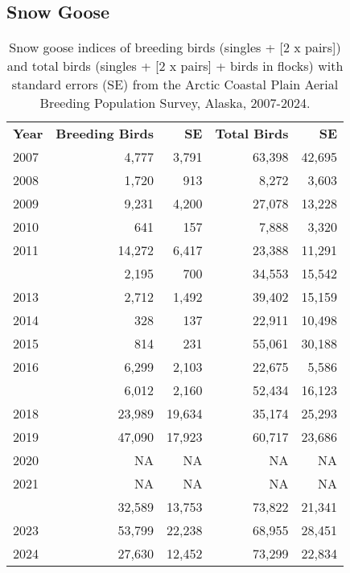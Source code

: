 \documentclass[
]{article}
\begin{document}
\newpage{}

\subsection*{Snow Goose}\label{snow-goose-1}

\begingroup\fontsize{10}{12}\selectfont

\begin{longtable}[t]{lrrrr}

\caption{\label{tbl-SNGO}Snow goose indices of breeding birds (singles +
{[}2 x pairs{]}) and total birds (singles + {[}2 x pairs{]} + birds in
flocks) with standard errors (SE) from the Arctic Coastal Plain Aerial
Breeding Population Survey, Alaska, 2007-2024.}

\tabularnewline

\\
\toprule
\textbf{Year} & \textbf{Breeding Birds} & \textbf{SE} & \textbf{Total Birds} & \textbf{SE}\\
\midrule
2007 & 4,777 & 3,791 & 63,398 & 42,695\\
2008 & 1,720 & 913 & 8,272 & 3,603\\
2009 & 9,231 & 4,200 & 27,078 & 13,228\\
2010 & 641 & 157 & 7,888 & 3,320\\
2011 & 14,272 & 6,417 & 23,388 & 11,291\\
\addlinespace
2012 & 2,195 & 700 & 34,553 & 15,542\\
2013 & 2,712 & 1,492 & 39,402 & 15,159\\
2014 & 328 & 137 & 22,911 & 10,498\\
2015 & 814 & 231 & 55,061 & 30,188\\
2016 & 6,299 & 2,103 & 22,675 & 5,586\\
\addlinespace
2017 & 6,012 & 2,160 & 52,434 & 16,123\\
2018 & 23,989 & 19,634 & 35,174 & 25,293\\
2019 & 47,090 & 17,923 & 60,717 & 23,686\\
2020 & NA & NA & NA & NA\\
2021 & NA & NA & NA & NA\\
\addlinespace
2022 & 32,589 & 13,753 & 73,822 & 21,341\\
2023 & 53,799 & 22,238 & 68,955 & 28,451\\
2024 & 27,630 & 12,452 & 73,299 & 22,834\\
\bottomrule

\end{longtable}
\end{document}
